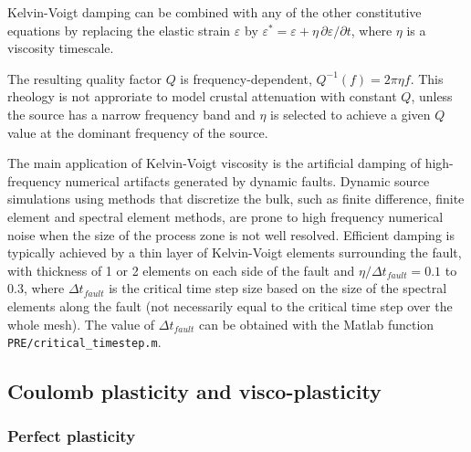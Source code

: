 Kelvin-Voigt damping can be combined with any of the other constitutive equations
by replacing the elastic strain $\varepsilon$ by $\varepsilon^* = \varepsilon + \eta\,\partial\varepsilon/\partial t$,
where $\eta$ is a viscosity timescale.

The resulting quality factor $Q$ is frequency-dependent, $Q^{-1}(f) = 2\pi\eta f$.
This rheology is not approriate to model crustal attenuation with constant $Q$, 
unless the source has a narrow frequency band
and $\eta$ is selected to achieve a given $Q$ value at the dominant frequency of the source.

The main application of Kelvin-Voigt viscosity is the artificial damping of high-frequency
numerical artifacts generated by dynamic faults.
Dynamic source simulations using methods that discretize the bulk, such as
finite difference, finite element and spectral
element methods, are prone to high frequency numerical noise 
when the size of the process zone is not well resolved.
Efficient damping is typically achieved
by a thin layer of Kelvin-Voigt elements surrounding the fault,
with thickness of 1 or 2 elements on each side of the fault
and $\eta/\Delta t_{fault} = 0.1$ to $0.3$, where $\Delta t_{fault}$ 
is the critical time step size based on the size of the spectral elements along the fault
(not necessarily equal to the critical time step over the whole mesh).
The value of $\Delta t_{fault}$ can be obtained with 
the Matlab function \texttt{PRE/critical\_timestep.m}.


\subsection{Coulomb plasticity and visco-plasticity}

\subsubsection{Perfect plasticity}

